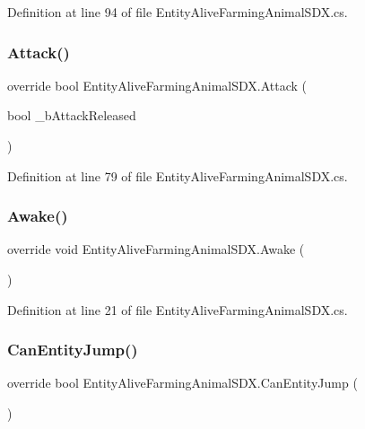 Definition at line 94 of file Entity\+Alive\+Farming\+Animal\+S\+D\+X.\+cs.

\mbox{\label{class_entity_alive_farming_animal_s_d_x_af1bff3e18731ed19c9435023f104c782}} 
\subsubsection{\texorpdfstring{Attack()}{Attack()}}
{\footnotesize\ttfamily override bool Entity\+Alive\+Farming\+Animal\+S\+D\+X.\+Attack (\begin{DoxyParamCaption}\item[{bool}]{\+\_\+b\+Attack\+Released }\end{DoxyParamCaption})}



Definition at line 79 of file Entity\+Alive\+Farming\+Animal\+S\+D\+X.\+cs.

\mbox{\label{class_entity_alive_farming_animal_s_d_x_ac0eff244bc0cdca504d1ea16ec93077d}} 
\subsubsection{\texorpdfstring{Awake()}{Awake()}}
{\footnotesize\ttfamily override void Entity\+Alive\+Farming\+Animal\+S\+D\+X.\+Awake (\begin{DoxyParamCaption}{ }\end{DoxyParamCaption})\hspace{0.3cm}{\ttfamily [protected]}}



Definition at line 21 of file Entity\+Alive\+Farming\+Animal\+S\+D\+X.\+cs.

\mbox{\label{class_entity_alive_farming_animal_s_d_x_a30b47d85e719e776aae7f150e5dfe6c5}} 
\subsubsection{\texorpdfstring{CanEntityJump()}{CanEntityJump()}}
{\footnotesize\ttfamily override bool Entity\+Alive\+Farming\+Animal\+S\+D\+X.\+Can\+Entity\+Jump (\begin{DoxyParamCaption}{ }\end{DoxyParamCaption})}



